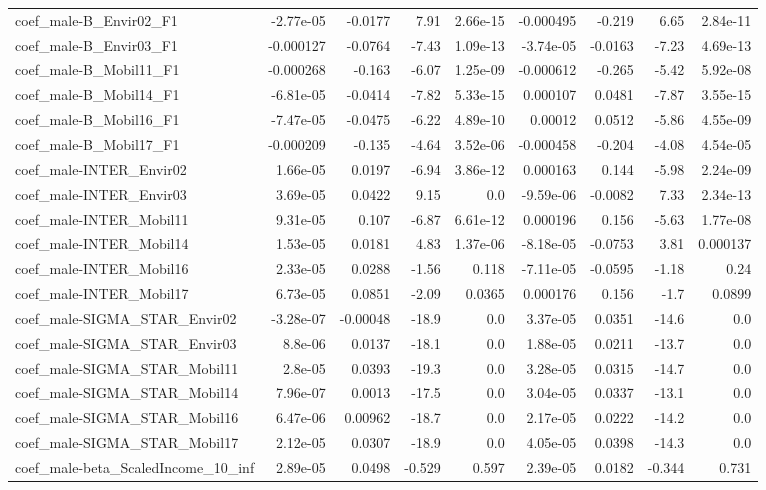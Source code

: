 \begin{tabular}{lrrrrrrrr}
coef_male-B_Envir02_F1 & -2.77e-05 & -0.0177 & 7.91 & 2.66e-15 & -0.000495 & -0.219 & 6.65 & 2.84e-11 \\
coef_male-B_Envir03_F1 & -0.000127 & -0.0764 & -7.43 & 1.09e-13 & -3.74e-05 & -0.0163 & -7.23 & 4.69e-13 \\
coef_male-B_Mobil11_F1 & -0.000268 & -0.163 & -6.07 & 1.25e-09 & -0.000612 & -0.265 & -5.42 & 5.92e-08 \\
coef_male-B_Mobil14_F1 & -6.81e-05 & -0.0414 & -7.82 & 5.33e-15 & 0.000107 & 0.0481 & -7.87 & 3.55e-15 \\
coef_male-B_Mobil16_F1 & -7.47e-05 & -0.0475 & -6.22 & 4.89e-10 & 0.00012 & 0.0512 & -5.86 & 4.55e-09 \\
coef_male-B_Mobil17_F1 & -0.000209 & -0.135 & -4.64 & 3.52e-06 & -0.000458 & -0.204 & -4.08 & 4.54e-05 \\
coef_male-INTER_Envir02 & 1.66e-05 & 0.0197 & -6.94 & 3.86e-12 & 0.000163 & 0.144 & -5.98 & 2.24e-09 \\
coef_male-INTER_Envir03 & 3.69e-05 & 0.0422 & 9.15 & 0.0 & -9.59e-06 & -0.0082 & 7.33 & 2.34e-13 \\
coef_male-INTER_Mobil11 & 9.31e-05 & 0.107 & -6.87 & 6.61e-12 & 0.000196 & 0.156 & -5.63 & 1.77e-08 \\
coef_male-INTER_Mobil14 & 1.53e-05 & 0.0181 & 4.83 & 1.37e-06 & -8.18e-05 & -0.0753 & 3.81 & 0.000137 \\
coef_male-INTER_Mobil16 & 2.33e-05 & 0.0288 & -1.56 & 0.118 & -7.11e-05 & -0.0595 & -1.18 & 0.24 \\
coef_male-INTER_Mobil17 & 6.73e-05 & 0.0851 & -2.09 & 0.0365 & 0.000176 & 0.156 & -1.7 & 0.0899 \\
coef_male-SIGMA_STAR_Envir02 & -3.28e-07 & -0.00048 & -18.9 & 0.0 & 3.37e-05 & 0.0351 & -14.6 & 0.0 \\
coef_male-SIGMA_STAR_Envir03 & 8.8e-06 & 0.0137 & -18.1 & 0.0 & 1.88e-05 & 0.0211 & -13.7 & 0.0 \\
coef_male-SIGMA_STAR_Mobil11 & 2.8e-05 & 0.0393 & -19.3 & 0.0 & 3.28e-05 & 0.0315 & -14.7 & 0.0 \\
coef_male-SIGMA_STAR_Mobil14 & 7.96e-07 & 0.0013 & -17.5 & 0.0 & 3.04e-05 & 0.0337 & -13.1 & 0.0 \\
coef_male-SIGMA_STAR_Mobil16 & 6.47e-06 & 0.00962 & -18.7 & 0.0 & 2.17e-05 & 0.0222 & -14.2 & 0.0 \\
coef_male-SIGMA_STAR_Mobil17 & 2.12e-05 & 0.0307 & -18.9 & 0.0 & 4.05e-05 & 0.0398 & -14.3 & 0.0 \\
coef_male-beta_ScaledIncome_10_inf & 2.89e-05 & 0.0498 & -0.529 & 0.597 & 2.39e-05 & 0.0182 & -0.344 & 0.731 \\

\end{tabular}
